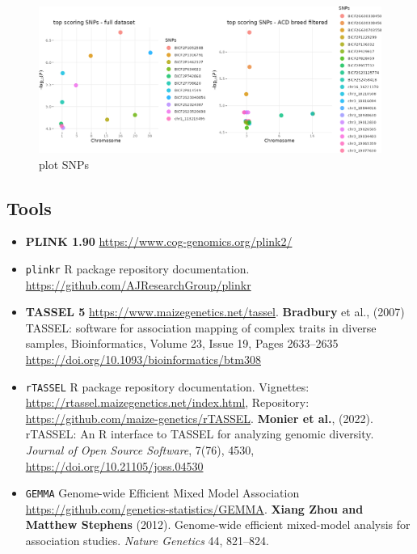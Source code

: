 \begin{figure}
  \centering
  \includegraphics{Figures/top_SNPs_comb.png?raw=true}
  \caption{plot SNPs}
\end{figure}

\hypertarget{tools}{%
  \subsection{Tools}\label{tools}}

\begin{itemize}
  \item
        \textbf{PLINK 1.90} \url{https://www.cog-genomics.org/plink2/}
  \item
        \texttt{plinkr} R package repository documentation.
        \url{https://github.com/AJResearchGroup/plinkr}
  \item
        \textbf{TASSEL 5} \url{https://www.maizegenetics.net/tassel}.
        \textbf{Bradbury} et al., (2007) TASSEL: software for association
        mapping of complex traits in diverse samples, Bioinformatics, Volume
        23, Issue 19, Pages 2633--2635
        \url{https://doi.org/10.1093/bioinformatics/btm308}
  \item
        \texttt{rTASSEL} R package repository documentation. Vignettes:
        \url{https://rtassel.maizegenetics.net/index.html}, Repository:
        \url{https://github.com/maize-genetics/rTASSEL}. \textbf{Monier et
          al.}, (2022). rTASSEL: An R interface to TASSEL for analyzing genomic
        diversity. \emph{Journal of Open Source Software}, 7(76), 4530,
        \url{https://doi.org/10.21105/joss.04530}
  \item
        \texttt{GEMMA} Genome-wide Efficient Mixed Model Association
        \url{https://github.com/genetics-statistics/GEMMA}. \textbf{Xiang Zhou
          and Matthew Stephens} (2012). Genome-wide efficient mixed-model
        analysis for association studies. \emph{Nature Genetics} 44, 821--824.
\end{itemize}

